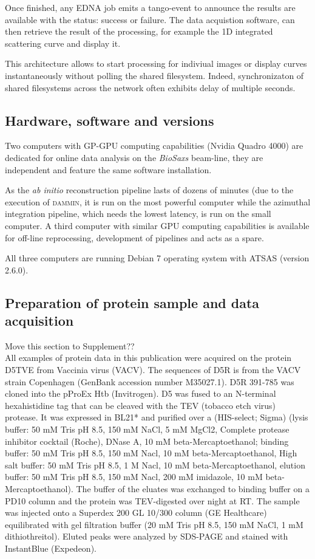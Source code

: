 \documentclass[preprint,pdf]{iucr}              %
\begin{document}
Once finished, any EDNA job emits a tango-event to announce the results are
available with the status: success or failure.
The data acquistion software, can then retrieve the result
of the processing, for example the 1D integrated scattering curve and
display it.

This architecture allows to start processing for indiviual images or
display curves instantaneously without polling the shared filesystem.
Indeed, synchronizaton of shared filesystems across the network
often exhibits delay of multiple seconds.

\subsection{Hardware, software and versions}
Two computers with GP-GPU computing capabilities (Nvidia Quadro 4000) are
dedicated for online data analysis on the \textit{BioSaxs} beam-line, they are
independent and feature the same software installation.

As the \textit{ab initio} reconstruction pipeline lasts of dozens of minutes
(due to the execution of \textsc{dammin}, it is run on the most powerful
computer while the azimuthal integration pipeline, which needs the lowest latency, is run on
the small computer.
A third computer with similar GPU computing capabilities is available for
off-line reprocessing, development of pipelines and acts as a spare.

All three computers are running Debian 7 operating system with ATSAS
(version 2.6.0).


\subsection{Preparation of protein sample and data acquisition}
 Move this section to Supplement??\\
All examples of protein data in this publication were acquired on the protein D5TVE from Vaccinia virus (VACV).
The sequences of D5R is from the VACV strain Copenhagen (GenBank accession number M35027.1). D5R 391-785 was cloned into the pProEx Htb (Invitrogen). D5 was fused to an N-terminal hexahistidine tag that can be cleaved with the TEV (tobacco etch virus) protease. It was expressed in BL21* and purified over a (HIS-select; Sigma) (lysis buffer: 50 mM Tris pH 8.5, 150 mM NaCl, 5 mM MgCl2, Complete protease inhibitor cocktail (Roche), DNase A, 10 mM beta-Mercaptoethanol; binding buffer: 50 mM Tris pH 8.5, 150 mM Nacl, 10 mM beta-Mercaptoethanol, High salt buffer: 50 mM Tris pH 8.5, 1 M Nacl, 10 mM beta-Mercaptoethanol, elution buffer: 50 mM Tris pH 8.5, 150 mM Nacl,  200 mM imidazole, 10 mM beta-Mercaptoethanol). The buffer of the eluates was exchanged to binding buffer on a PD10 column and the protein was TEV-digested over night at RT. The sample was injected onto a Superdex 200 GL 10/300 column (GE Healthcare) equilibrated with gel filtration buffer (20 mM Tris pH 8.5, 150 mM NaCl, 1 mM dithiothreitol). Eluted peaks were analyzed by SDS-PAGE and stained with InstantBlue (Expedeon).
\end{document}
